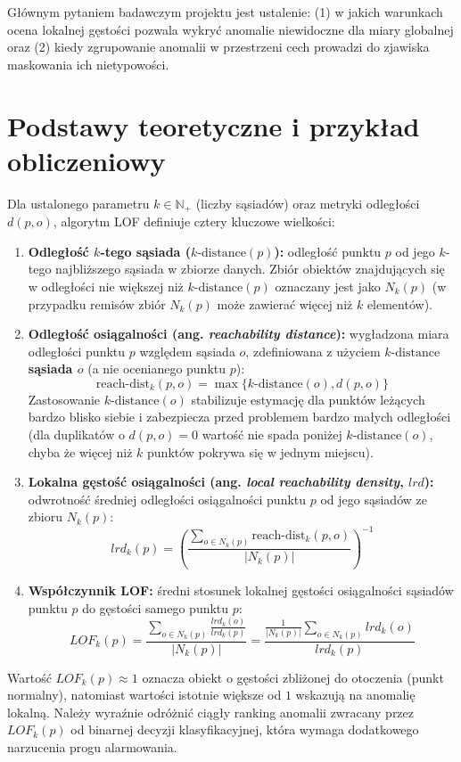 \documentclass[a4paper,fleqn]{cas-sc}
\begin{document}
Głównym pytaniem badawczym projektu jest ustalenie: (1) w jakich warunkach ocena lokalnej gęstości pozwala wykryć anomalie niewidoczne dla miary globalnej oraz (2) kiedy zgrupowanie anomalii w przestrzeni cech prowadzi do zjawiska maskowania ich nietypowości.

\section{Podstawy teoretyczne i przykład obliczeniowy}
Dla ustalonego parametru $k \in \mathbb{N}_+$ (liczby sąsiadów) oraz metryki odległości $d(p, o)$, algorytm LOF definiuje cztery kluczowe wielkości:
\begin{enumerate}
    \item \textbf{Odległość $k$-tego sąsiada ($k\text{-distance}(p)$):} odległość punktu $p$ od jego $k$-tego najbliższego sąsiada w zbiorze danych. Zbiór obiektów znajdujących się w odległości nie większej niż $k\text{-distance}(p)$ oznaczany jest jako $N_k(p)$ (w przypadku remisów zbiór $N_k(p)$ może zawierać więcej niż $k$ elementów).
    \item \textbf{Odległość osiągalności (ang. \textit{reachability distance}):} wygładzona miara odległości punktu $p$ względem sąsiada $o$, zdefiniowana z użyciem $k\text{-distance}$ \textbf{sąsiada $o$} (a nie ocenianego punktu $p$):
    \begin{equation}
        \text{reach-dist}_k(p, o) = \max \{ k\text{-distance}(o), d(p, o) \}
    \end{equation}
    Zastosowanie $k\text{-distance}(o)$ stabilizuje estymację dla punktów leżących bardzo blisko siebie i zabezpiecza przed problemem bardzo małych odległości (dla duplikatów o $d(p,o)=0$ wartość nie spada poniżej $k\text{-distance}(o)$, chyba że więcej niż $k$ punktów pokrywa się w jednym miejscu).
    \item \textbf{Lokalna gęstość osiągalności (ang. \textit{local reachability density}, $lrd$):} odwrotność średniej odległości osiągalności punktu $p$ od jego sąsiadów ze zbioru $N_k(p)$:
    \begin{equation}
        lrd_k(p) = \left( \frac{\sum_{o \in N_k(p)} \text{reach-dist}_k(p, o)}{|N_k(p)|} \right)^{-1}
    \end{equation}
    \item \textbf{Współczynnik LOF:} średni stosunek lokalnej gęstości osiągalności sąsiadów punktu $p$ do gęstości samego punktu $p$:
    \begin{equation}
        LOF_k(p) = \frac{\sum_{o \in N_k(p)} \frac{lrd_k(o)}{lrd_k(p)}}{|N_k(p)|} = \frac{\frac{1}{|N_k(p)|} \sum_{o \in N_k(p)} lrd_k(o)}{lrd_k(p)}
    \end{equation}
\end{enumerate}
Wartość $LOF_k(p) \approx 1$ oznacza obiekt o gęstości zbliżonej do otoczenia (punkt normalny), natomiast wartości istotnie większe od $1$ wskazują na anomalię lokalną. Należy wyraźnie odróżnić ciągły ranking anomalii zwracany przez $LOF_k(p)$ od binarnej decyzji klasyfikacyjnej, która wymaga dodatkowego narzucenia progu alarmowania.
\end{document}
